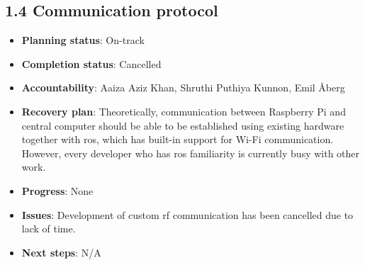 \subsection*{1.4 Communication protocol}
\begin{itemize}
    \item \textbf{Planning status}: On-track
    \item \textbf{Completion status}: Cancelled
    \item \textbf{Accountability}: Aaiza Aziz Khan, Shruthi Puthiya Kunnon, Emil Åberg
    \item \textbf{Recovery plan}: Theoretically, communication between Raspberry Pi and central computer should be able to be established using existing hardware together with \ac{ros}, which has built-in support for Wi-Fi communication. However, every developer who has \ac{ros} familiarity is currently busy with other work.
    \item \textbf{Progress}: None
    \item \textbf{Issues}: Development of custom \ac{rf} communication has been cancelled due to lack of time.
    \item \textbf{Next steps}: N/A
\end{itemize}


